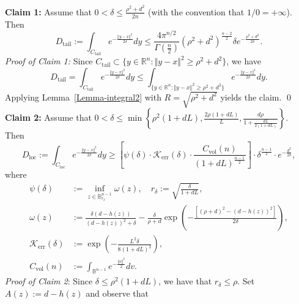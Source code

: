 \documentclass[11pt]{amsart}
\newcommand{\1}{\mathds{1}}
\theoremstyle{definition}
\theoremstyle{remark}
\theoremstyle{definition}
\begin{document}
\textbf{Claim 1:} Assume that $0<\delta\leq \frac{\rho^2+d^2}{2n}$ (with the convention that $1/0=+\infty$). Then
$$
D_{\operatorname{tail}}:=\int_{C_{\operatorname{tail}}} e^{-\frac{\Vert y-x\Vert^2}{2\delta}}dy\leq \frac{4\pi^{n/2}}{\Gamma\left(\frac{n}{2}\right)}(\rho^2+d^2)^{\frac{n-2}{2}} \delta e^{-\frac{\rho^2+d^2}{2\delta}}.
$$
\emph{Proof of Claim 1:} Since $C_{\operatorname{tail}}\subset \{ y\in \mathbb{R}^n: \Vert y-x\Vert^2 \geq \rho^2+d^2\}$, we have
$$
D_{\operatorname{tail}}=\int_{C_{\operatorname{tail}}} e^{-\frac{\Vert y-x\Vert^2}{2\delta}}dy\leq \int_{\{ y\in \mathbb{R}^n: \Vert y-x\Vert^2 \geq \rho^2+d^2\}} e^{-\frac{\Vert y-x\Vert^2}{2\delta}}dy.
$$
Applying Lemma~\ref{Lemma-integral2} with $R=\sqrt{\rho^2+d^2}$ yields the claim. \qed \newline
\noindent \textbf{Claim 2:} Assume that $0<\delta \leq  \min \left\{ \rho^2(1+dL),  \frac{2\rho(1+dL)}{L},  \frac{d\rho}{1 + \frac{dL}{2(1+dL)}} \right\}$. \\
Then
$$
D_{\operatorname{loc}}:=\int_{C_{\operatorname{loc}}} e^{-\frac{\Vert y-x\Vert^2}{2\delta}}dy
\geq \left[\psi(\delta) \cdot \mathcal{K}_{\operatorname{err}}(\delta)\cdot \frac{C_{\operatorname{vol}}(n)}{(1+dL)^{\frac{n-1}{2}}} \right]\cdot \delta^{\frac{n-1}{2}}\cdot e^{-\frac{d^2}{2\delta}},
$$
where 
\begin{equation*}
    \begin{aligned}
  \psi(\delta)&:=\inf_{z\in \mathbb{B}^{n-1}_{r_{\delta}}}\omega(z), \quad r_{\delta}:=\sqrt{\frac{\delta}{1+dL}},\\
  \omega(z)&:=\frac{\delta (d-h(z))}{(d-h(z))^2+\delta}-\frac{\delta}{\rho+d} \exp\left(-\frac{\left[(\rho+d)^2-(d-h(z))^2\right]}{2\delta}\right),\\
  \mathcal{K}_{\operatorname{err}}(\delta)&:=\exp\left(-\frac{L^2\delta}{8(1+dL)^2}\right),\\
 C_{\operatorname{vol}}(n)&:=\int_{\mathbb{B}^{n-1}}e^{-\frac{\Vert v\Vert^2}{2}}dv.
    \end{aligned}
\end{equation*}
\emph{Proof of Claim 2}: Since $\delta \leq \rho^2 (1+dL)$, we have that $r_{\delta}\leq \rho$. Set $A(z):=d-h(z)$ and observe that
\end{document}
